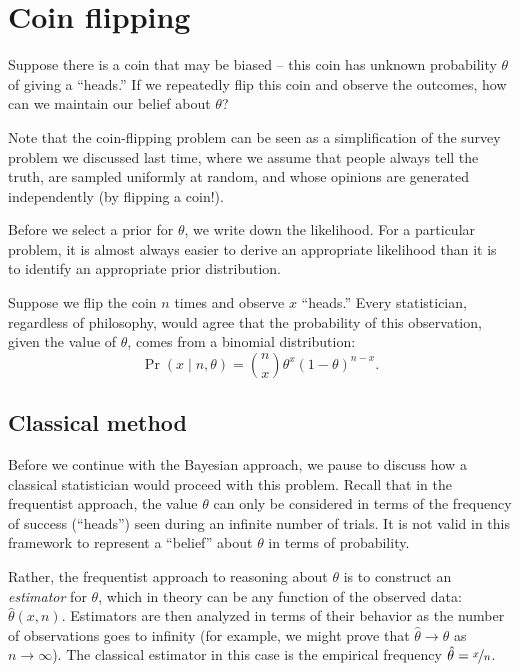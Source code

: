 \documentclass{article}
\newcommand{\given}{\mid}
\begin{document}
\section*{Coin flipping}

Suppose there is a coin that may be biased -- this coin has unknown
probability $\theta$ of giving a ``heads.''  If we repeatedly flip
this coin and observe the outcomes, how can we maintain our belief
about $\theta$?

Note that the coin-flipping problem can be seen as a simplification of
the survey problem we discussed last time, where we assume that people
always tell the truth, are sampled uniformly at random, and whose
opinions are generated independently (by flipping a coin!).

Before we select a prior for $\theta$, we write down the likelihood.
For a particular problem, it is almost always easier to derive an
appropriate likelihood than it is to identify an appropriate prior
distribution.

Suppose we flip the coin $n$ times and observe $x$ ``heads.''  Every
statistician, regardless of philosophy, would agree that the
probability of this observation, given the value of $\theta$, comes
from a binomial distribution:
\begin{equation*}
  \Pr(x \given n, \theta)
  =
  \binom{n}{x} \theta^x (1 - \theta)^{n - x}.
\end{equation*}

\subsection*{Classical method}

Before we continue with the Bayesian approach, we pause to discuss how
a classical statistician would proceed with this problem.  Recall that
in the frequentist approach, the value $\theta$ can only be considered
in terms of the frequency of success (``heads'') seen during an
infinite number of trials.  It is not valid in this framework to represent
a ``belief'' about $\theta$ in terms of probability.

Rather, the frequentist approach to reasoning about $\theta$ is to
construct an \emph{estimator} for $\theta$, which in theory can be any
function of the observed data: $\hat{\theta}(x, n)$.  Estimators are
then analyzed in terms of their behavior as the number of observations
goes to infinity (for example, we might prove that $\hat{\theta} \to
\theta$ as $n \to \infty$).  The classical estimator in this case is
the empirical frequency $\hat{\theta} = \nicefrac{x}{n}$.
\end{document}
